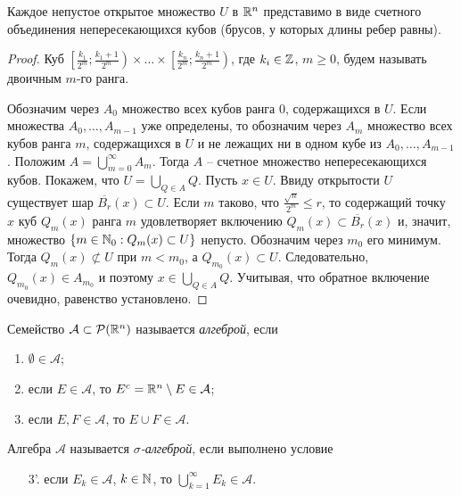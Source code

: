 \begin{lemma}
    \label{lebeg-lem1}
    Каждое непустое открытое множество $U$ в $\mathbb{R}^{n}$ представимо в виде счетного объединения непересекающихся кубов (брусов, у которых длины ребер равны).
\end{lemma}

\begin{proof}
    Куб $\left[\frac{k_{1}}{2^{m}};\frac{k_{1} + 1}{2^{m}}\right) \times \ldots \times \left[\frac{k_{n}}{2^{m}};\frac{k_{n} + 1}{2^{m}}\right)$, где $k_{i} \in \mathbb{Z}$, $m \geq 0$, будем называть двоичным $m$-го ранга.

    Обозначим через $A_{0}$ множество всех кубов ранга 0, содержащихся в $U$. Если множества $A_{0}, \ldots, A_{m - 1}$ уже определены, то обозначим через $A_{m}$ множество всех кубов ранга $m$, содержащихся в $U$ и не лежащих ни в одном кубе из $A_{0}, \ldots, A_{m - 1}$. Положим $A = \bigcup_{m = 0}^{\infty}A_{m}$. Тогда $A$ -- счетное множество непересекающихся кубов. Покажем, что $U = \bigcup_{Q \in A}Q$. Пусть $x \in U$. Ввиду открытости $U$ существует шар $\overline{B_{r}}(x) \subset U$. Если $m$ таково, что $\frac{\sqrt{n}}{2^{m}} \leq r$, то содержащий точку $x$ куб $Q_{m}(x)$ ранга $m$ удовлетворяет включению $Q_{m}(x) \subset \overline{B_{r}}(x)$ и, значит, множество $\{m \in \mathbb{N}_{0}: Q_{m}(x) \subset U\}$ непусто. Обозначим через $m_{0}$ его минимум. Тогда $Q_{m}(x) \not\subset U$ при $m < m_{0}$, а $Q_{m_{0}}(x) \subset U$. Следовательно, $Q_{m_{0}}(x) \in A_{m_{0}}$ и поэтому $x \in \bigcup_{Q \in A}Q$. Учитывая, что обратное включение очевидно, равенство установлено.
\end{proof}

\begin{definition}
    Семейство $\mathcal{A} \subset \mathcal{P}(\mathbb{R}^{n})$ называется \textit{алгеброй}, если 

    \begin{enumerate}
        \item $\emptyset \in \mathcal{A}$;
        \item если $E \in \mathcal{A}$, то $E^{c} = \mathbb{R}^{n} \setminus E \in \mathcal{A}$;
        \item если $E, F \in \mathcal{A}$, то $E \cup F \in \mathcal{A}$.
    \end{enumerate}

    Алгебра $\mathcal{A}$ называется \textit{$\sigma$-алгеброй}, если выполнено условие
    
    \begin{enumerate}
        \item[3'.] если $E_{k} \in \mathcal{A}$, $k \in \mathbb{N}$, то $\bigcup_{k = 1}^{\infty}E_{k} \in \mathcal{A}$.
    \end{enumerate}
\end{definition}

